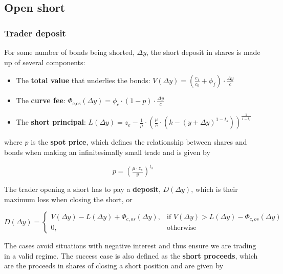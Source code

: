 \subsection{Open short}

\subsubsection{Trader deposit}\label{trader-deposit}
For some number of bonds being shorted, $\Delta y$, the short deposit in shares is made up of several components:

\begin{itemize}
\item The \textbf{total value} that underlies the bonds: $V(\Delta y) = \left( \frac{c_1}{c_0} + \phi_f \right) \cdot \frac{\Delta y}{c}$
\item The \textbf{curve fee}: $\Phi_{\text{c,os}}(\Delta y) = \phi_{c} \cdot (1 - p) \cdot \frac{\Delta y}{c}$
\item The \textbf{short principal}: $L(\Delta y) = z_e - \tfrac{1}{\mu} \cdot (\tfrac{\mu}{c} \cdot (k - (y + \Delta y)^{1 - t_s}))^{\tfrac{1}{1 - t_s}}$
\end{itemize}

where $p$ is the \textbf{spot price}, which defines the relationship between shares and bonds when making an infinitesimally small trade and is given by

\begin{equation}\label{spot-price}
p = \left( \tfrac{\mu \cdot z_e}{y} \right)^{t_s}
\end{equation}

The trader opening a short has to pay a \textbf{deposit}, $D(\Delta y)$, which is their maximum loss when closing the short, or

\begin{equation}\label{short-deposit}
D(\Delta y) =
\begin{cases}
    V(\Delta y) - L(\Delta y) + \Phi_{c,os}(\Delta y),
      & \text{if } V(\Delta y) > L(\Delta y) - \Phi_{c,os}(\Delta y) \\
    0,              & \text{otherwise}
\end{cases}
\end{equation}

The cases avoid situations with negative interest and thus ensure we are trading in a valid regime.
The success case is also defined as the \textbf{short proceeds}, which are the proceeds in shares of closing a short position and are given by

